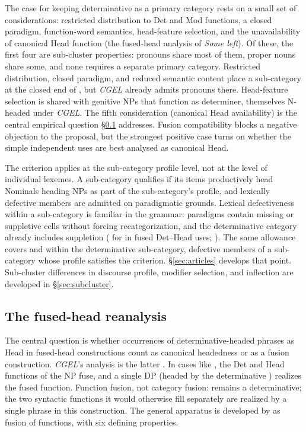 \documentclass[12pt]{article}
\begin{document}
The case for keeping determinative as a primary category rests on a small set of considerations: restricted distribution to Det and Mod functions, a closed paradigm, function-word semantics, head-feature selection, and the unavailability of canonical Head function (the fused-head analysis of \textit{Some left}). Of these, the first four are sub-cluster properties: pronouns share most of them, proper nouns share some, and none requires a separate primary category. Restricted distribution, closed paradigm, and reduced semantic content place a sub-category at the closed end of , but \textit{CGEL} already admits pronouns there. Head-feature selection is shared with genitive NPs that function as determiner, themselves N-headed under \textit{CGEL}. The fifth consideration (canonical Head availability) is the central empirical question §\ref{subsec:fused-head} addresses. Fusion compatibility blocks a negative objection to the proposal, but the strongest positive case turns on whether the simple independent uses are best analysed as canonical Head.

The criterion applies at the sub-category profile level, not at the level of individual lexemes. A sub-category qualifies if its items productively head Nominals heading NPs as part of the sub-category's profile, and lexically defective members are admitted on paradigmatic grounds. Lexical defectiveness within a sub-category is familiar in the grammar: paradigms contain missing or suppletive cells without forcing recategorization, and the determinative category already includes suppletion ( for  in fused Det--Head uses; \textcite[22--23]{Payne2007}). The same allowance covers  and  within the determinative sub-category, defective members of a sub-category whose profile satisfies the criterion. §\ref{sec:articles} develops that point. Sub-cluster differences in discourse profile, modifier selection, and inflection are developed in §\ref{sec:subcluster}.

\subsection{The fused-head reanalysis}\label{subsec:fused-head}

The central question is whether occurrences of determinative-headed phrases as Head in fused-head constructions count as canonical headedness or as a fusion construction. \textit{CGEL}'s analysis is the latter \citep[Ch.~5 §9]{huddleston2002}. In cases like , the Det and Head functions of the NP fuse, and a single DP (headed by the determinative ) realizes the fused function. Function fusion, not category fusion:  remains a determinative; the two syntactic functions it would otherwise fill separately are realized by a single phrase in this construction. The general apparatus is developed by \textcite{Payne2007} as fusion of functions, with six defining properties.
\end{document}
